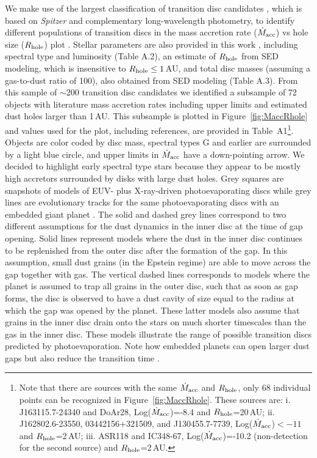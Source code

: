 \documentclass{rsos}
\begin{document}
We make use of the largest classification of transition disc candidates  \cite{2016A&A...585A..58V}, which is based on {\it Spitzer} and complementary long-wavelength photometry, to identify different populations of transition discs in the mass accretion rate ($\dot{M}_{\rm acc}$)
vs hole size ($R_{\rm hole}$) plot 
\cite{2012MNRAS.426L..96O}.
Stellar parameters are also provided in this work \cite{2016A&A...585A..58V}, including spectral type and luminosity (Table A.2), an estimate of $R_{\rm hole}$ from SED modeling, which is insensitive to $R_{\rm hole}\le 1$\,AU, and total disc masses (assuming a gas-to-dust ratio of 100), also obtained from SED modeling (Table A.3). From this sample of $\sim$200 transition disc candidates we identified a subsample of 72 objects with literature mass accretion rates including upper limits and estimated dust holes larger than 1\,AU. This subsample is plotted in Figure~\ref{fig:MaccRhole} and values used for the plot, including references, are provided in Table~A1\footnote{Note that there are sources with the same $\dot{M}_{\rm acc}$ and $R_{\rm hole}$, only 68 individual points can be recognized in Figure~\ref{fig:MaccRhole}. These sources are: i. J163115.7-24340 and DoAr28, Log($\dot{M}_{\rm acc}$)=-8.4 and $R_{\rm hole}$=20\,AU; ii. J162802.6-23550, 03442156+321509, and J130455.7-7739, Log($\dot{M}_{\rm acc}$)$<-11$ and $R_{\rm hole}$=2\,AU; iii. ASR118 and IC348-67, Log($\dot{M}_{\rm acc}$)=-10.2 (non-detection for the second source) and $R_{\rm hole}$=2\,AU.}. Objects are color coded by disc mass, spectral types G and earlier are surrounded by a light blue circle, and upper limits in $\dot{M}_{\rm acc}$ have a down-pointing arrow. We decided to highlight early spectral type stars because they appear to be mostly high accretors surrounded by disks with large dust holes.
Grey squares are snapshots of models of EUV- plus X-ray-driven photoevaporating discs  \cite{2011MNRAS.412...13O} while grey lines are evolutionary tracks for the same photoevaporating discs with an embedded giant planet \cite{2013MNRAS.430.1392R}. The solid and dashed grey lines correspond to two different assumptions for the dust dynamics in the inner disc at the time of gap opening. Solid lines represent models where the dust in the inner disc continues to be replenished from the outer disc after the formation of the gap. In this assumption, small dust grains (in the Epstein regime) are able to move across the gap together with gas. The vertical dashed lines corresponds to models where the planet is assumed to trap all grains in the outer disc, such that as soon as gap forms, the disc is observed to have a dust cavity of size equal to the radius at which the gap was opened by the planet. These latter models also assume that grains in the inner disc drain onto the stars on much shorter timescales than the gas in the inner disc. 
These models illustrate  the range of possible transition discs predicted by photoevaporation. Note how embedded planets can open larger dust gaps but also reduce the transition time 
\cite{2013MNRAS.430.1392R}.
\end{document}
